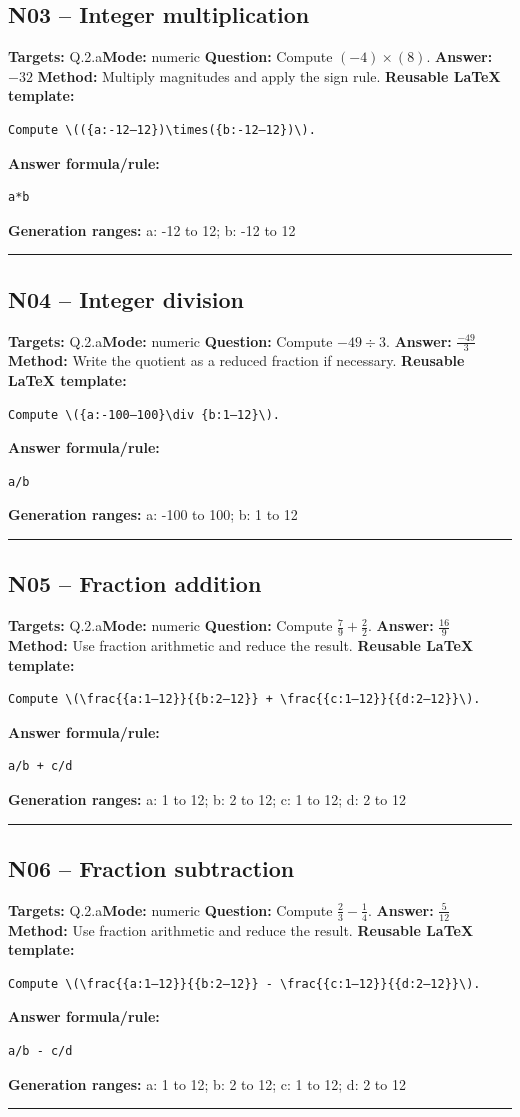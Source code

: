 \documentclass[11pt]{article}
\begin{document}
\subsection{N03 -- Integer multiplication}
\textbf{Targets:} Q.2.a\quad\textbf{Mode:} numeric
\textbf{Question:} Compute \((-4)\times(8)\).
\textbf{Answer:} \(-32\)
\textbf{Method:} Multiply magnitudes and apply the sign rule.
\textbf{Reusable LaTeX template:}
\begin{verbatim}
Compute \(({a:-12–12})\times({b:-12–12})\).
\end{verbatim}
\textbf{Answer formula/rule:}
\begin{verbatim}
a*b
\end{verbatim}
\textbf{Generation ranges:} a: -12 to 12; b: -12 to 12
\medskip\hrule\medskip
\subsection{N04 -- Integer division}
\textbf{Targets:} Q.2.a\quad\textbf{Mode:} numeric
\textbf{Question:} Compute \(-49\div 3\).
\textbf{Answer:} \(\frac{-49}{3}\)
\textbf{Method:} Write the quotient as a reduced fraction if necessary.
\textbf{Reusable LaTeX template:}
\begin{verbatim}
Compute \({a:-100–100}\div {b:1–12}\).
\end{verbatim}
\textbf{Answer formula/rule:}
\begin{verbatim}
a/b
\end{verbatim}
\textbf{Generation ranges:} a: -100 to 100; b: 1 to 12
\medskip\hrule\medskip
\subsection{N05 -- Fraction addition}
\textbf{Targets:} Q.2.a\quad\textbf{Mode:} numeric
\textbf{Question:} Compute \(\frac{7}{9} + \frac{2}{2}\).
\textbf{Answer:} \(\frac{16}{9}\)
\textbf{Method:} Use fraction arithmetic and reduce the result.
\textbf{Reusable LaTeX template:}
\begin{verbatim}
Compute \(\frac{{a:1–12}}{{b:2–12}} + \frac{{c:1–12}}{{d:2–12}}\).
\end{verbatim}
\textbf{Answer formula/rule:}
\begin{verbatim}
a/b + c/d
\end{verbatim}
\textbf{Generation ranges:} a: 1 to 12; b: 2 to 12; c: 1 to 12; d: 2 to 12
\medskip\hrule\medskip
\subsection{N06 -- Fraction subtraction}
\textbf{Targets:} Q.2.a\quad\textbf{Mode:} numeric
\textbf{Question:} Compute \(\frac{2}{3} - \frac{1}{4}\).
\textbf{Answer:} \(\frac{5}{12}\)
\textbf{Method:} Use fraction arithmetic and reduce the result.
\textbf{Reusable LaTeX template:}
\begin{verbatim}
Compute \(\frac{{a:1–12}}{{b:2–12}} - \frac{{c:1–12}}{{d:2–12}}\).
\end{verbatim}
\textbf{Answer formula/rule:}
\begin{verbatim}
a/b - c/d
\end{verbatim}
\textbf{Generation ranges:} a: 1 to 12; b: 2 to 12; c: 1 to 12; d: 2 to 12
\medskip\hrule\medskip
\end{document}
